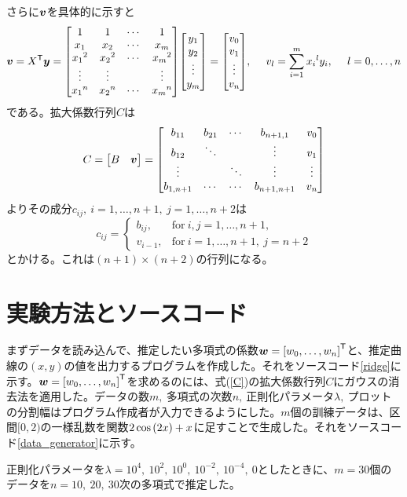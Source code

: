 \documentclass[dvipdfmx,autodetect-engine]{jsarticle}%
\begin{document}
さらに$\vb*{v}$を具体的に示すと
$$\vb*{v}=X^\T \vb*{y} = \mqty[1 & 1 & \cdots &1 \\ x_1 & x_2 & \cdots & x_m \\ {x_1}^2 & {x_2}^2 & \cdots & {x_m}^2 \\ \vdots & \vdots & & \vdots \\ {x_1}^n & {x_2}^n & \cdots & {x_m}^n] \mqty[y_1 \\ y_2 \\ \vdots \\ y_m ] = \mqty[ v_0 \\ v_1 \\ \vdots \\ v_{n}],~~~~v_l = \sum_{i=1}^{m} {x_i}^{l} y_i,~~~~l=0,\ldots,n$$
である。拡大係数行列$C$は
\begin{equation}
C=\mqty[B & \vb*{v}]=\mqty[ b_{11} & b_{21} & \cdots & b_{n+1,1} & v_0 \\ b_{12} & \ddots & & \vdots & v_1 \\ \vdots & & \ddots & \vdots & \vdots \\ b_{1, n+1} & \cdots & \cdots & b_{n+1, n+1} & v_n] \label{C}
\end{equation}
よりその成分$c_{ij},~i=1,\ldots,n+1,~ j=1,\ldots,n+2$は
$$c_{ij}=\left\{\begin{array}{ll}{b_{ij},} & {\mathrm{for}~i,j=1,\ldots,n+1,} \\ {v_{i-1},} & {\mathrm{for}~i=1,\ldots,n+1,~j=n+2}\end{array}\right.$$
とかける。これは$(n+1)\times(n+2)$の行列になる。

\section{実験方法とソースコード}
まずデータを読み込んで、推定したい多項式の係数$\vb*{w} = \qty[w_0,\ldots,w_n]^{\mathsf{T}}$と、推定曲線の$(x,y)$の値を出力するプログラムを作成した。それをソースコード\ref{ridge}に示す。$\vb*{w} = \qty[w_0,\ldots,w_n]^{\mathsf{T}}$を求めるのには、式(\ref{C})の拡大係数行列$C$にガウスの消去法を適用した。データの数$m,~$多項式の次数$n,~$正則化パラメータ$\lambda,~$プロットの分割幅はプログラム作成者が入力できるようにした。$m$個の訓練データは、区間$[0,2)$の一様乱数を関数$2\cos\qty(2x)+x$に足すことで生成した。それをソースコード\ref{data_generator}に示す。

正則化パラメータを$\lambda = 10^4,~10^2,~10^0,~10^{-2},~10^{-4},~0$としたときに、$m=30$個のデータを$n=10,~20,~30$次の多項式で推定した。
\end{document}
